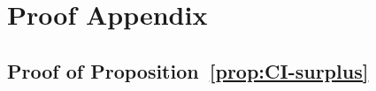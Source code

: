 \documentclass[master.tex]{subfiles}
\begin{document}

\section{Proof Appendix}


\subsection{Proof of Proposition~\ref{prop:CI-surplus}}
\end{document}
